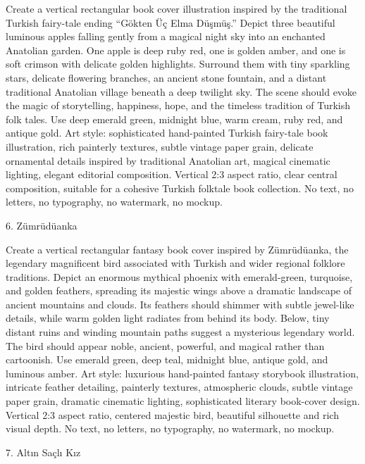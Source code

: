 \documentclass[12pt,a4paper]{article}
\begin{document}
Create a vertical rectangular book cover illustration inspired by the traditional Turkish fairy-tale ending “Gökten Üç Elma Düşmüş.” Depict three beautiful luminous apples falling gently from a magical night sky into an enchanted Anatolian garden. One apple is deep ruby red, one is golden amber, and one is soft crimson with delicate golden highlights. Surround them with tiny sparkling stars, delicate flowering branches, an ancient stone fountain, and a distant traditional Anatolian village beneath a deep twilight sky. The scene should evoke the magic of storytelling, happiness, hope, and the timeless tradition of Turkish folk tales. Use deep emerald green, midnight blue, warm cream, ruby red, and antique gold. Art style: sophisticated hand-painted Turkish fairy-tale book illustration, rich painterly textures, subtle vintage paper grain, delicate ornamental details inspired by traditional Anatolian art, magical cinematic lighting, elegant editorial composition. Vertical 2:3 aspect ratio, clear central composition, suitable for a cohesive Turkish folktale book collection. No text, no letters, no typography, no watermark, no mockup.

6. Zümrüdüanka
 
Create a vertical rectangular fantasy book cover inspired by Zümrüdüanka, the legendary magnificent bird associated with Turkish and wider regional folklore traditions. Depict an enormous mythical phoenix with emerald-green, turquoise, and golden feathers, spreading its majestic wings above a dramatic landscape of ancient mountains and clouds. Its feathers should shimmer with subtle jewel-like details, while warm golden light radiates from behind its body. Below, tiny distant ruins and winding mountain paths suggest a mysterious legendary world. The bird should appear noble, ancient, powerful, and magical rather than cartoonish. Use emerald green, deep teal, midnight blue, antique gold, and luminous amber. Art style: luxurious hand-painted fantasy storybook illustration, intricate feather detailing, painterly textures, atmospheric clouds, subtle vintage paper grain, dramatic cinematic lighting, sophisticated literary book-cover design. Vertical 2:3 aspect ratio, centered majestic bird, beautiful silhouette and rich visual depth. No text, no letters, no typography, no watermark, no mockup.

7. Altın Saçlı Kız
 
\end{document}
